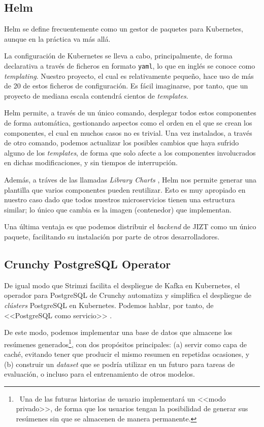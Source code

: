 \subsection{Helm}

Helm se define frecuentemente como un gestor de paquetes para Kubernetes, aunque en la práctica va más allá.

La configuración de Kubernetes se lleva a cabo, principalmente, de forma declarativa a través de ficheros en formato \texttt{yaml}, lo que en inglés se conoce como \emph{templating}. Nuestro proyecto, el cual es relativamente pequeño, hace uso de más de 20 de estos ficheros de configuración. Es fácil imaginarse, por tanto, que un proyecto de mediana escala contendrá cientos de \emph{templates}.

Helm permite, a través de un único comando, desplegar todos estos componentes de forma automática, gestionando aspectos como el orden en el que se crean los componentes, el cual en muchos casos no es trivial. Una vez instalados, a través de otro comando, podemos actualizar los posibles cambios que haya sufrido alguno de los \emph{templates}, de forma que solo afecte a los componentes involucrados en dichas modificaciones, y sin tiempos de interrupción.

Además, a tráves de las llamadas \emph{Library Charts} \cite{helm-lib-charts}, Helm nos permite generar una plantilla que varios componentes pueden reutilizar. Esto es muy apropiado en nuestro caso dado que todos nuestros microservicios tienen una estructura similar; lo único que cambia es la imagen (contenedor) que implementan.

Una última ventaja es que podemos distribuir el \emph{backend} de JIZT como un único paquete, facilitando su instalación por parte de otros desarrolladores.


\subsection{Crunchy PostgreSQL Operator}

De igual modo que Strimzi facilita el despliegue de Kafka en Kubernetes, el operador para PostgreSQL de Crunchy automatiza y simplifica el despliegue de \emph{clústers} PostgreSQL en Kubernetes. Podemos hablar, por tanto, de <<PostgreSQL como servicio>> \cite{crunchy21}.

De este modo, podemos implementar una base de datos que almacene los resúmenes generados\footnote{\, Una de las futuras historias de usuario implementará un <<modo privado>>, de forma que los usuarios tengan la posibilidad de generar sus resúmenes sin que se almacenen de manera permanente.}, con dos propósitos principales: (a) servir como capa de caché, evitando tener que producir el mismo resumen en repetidas ocasiones, y (b) construir un \emph{dataset} que se podría utilizar en un futuro para tareas de evaluación, o incluso para el entrenamiento de otros modelos.

